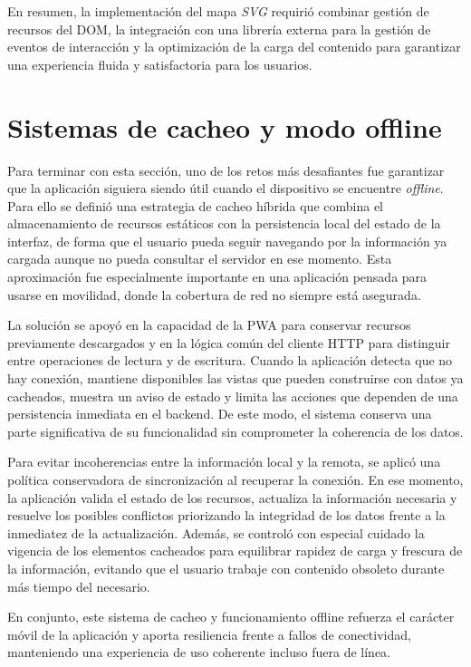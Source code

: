 En resumen, la implementación del mapa \textit{SVG} requirió combinar gestión de recursos del DOM, la integración con una librería externa para la gestión de eventos de interacción y la optimización de la carga del contenido para garantizar una experiencia fluida y satisfactoria para los usuarios.


\section{Sistemas de cacheo y modo offline}

Para terminar con esta sección, uno de los retos más desafiantes fue garantizar que la aplicación siguiera siendo útil cuando el dispositivo se encuentre \textit{offline}. Para ello se definió una estrategia de cacheo híbrida que combina el almacenamiento de recursos estáticos con la persistencia local del estado de la interfaz, de forma que el usuario pueda seguir navegando por la información ya cargada aunque no pueda consultar el servidor en ese momento. Esta aproximación fue especialmente importante en una aplicación pensada para usarse en movilidad, donde la cobertura de red no siempre está asegurada.

La solución se apoyó en la capacidad de la PWA para conservar recursos previamente descargados y en la lógica común del cliente HTTP para distinguir entre operaciones de lectura y de escritura. Cuando la aplicación detecta que no hay conexión, mantiene disponibles las vistas que pueden construirse con datos ya cacheados, muestra un aviso de estado y limita las acciones que dependen de una persistencia inmediata en el backend. De este modo, el sistema conserva una parte significativa de su funcionalidad sin comprometer la coherencia de los datos.

Para evitar incoherencias entre la información local y la remota, se aplicó una política conservadora de sincronización al recuperar la conexión. En ese momento, la aplicación valida el estado de los recursos, actualiza la información necesaria y resuelve los posibles conflictos priorizando la integridad de los datos frente a la inmediatez de la actualización. Además, se controló con especial cuidado la vigencia de los elementos cacheados para equilibrar rapidez de carga y frescura de la información, evitando que el usuario trabaje con contenido obsoleto durante más tiempo del necesario.

En conjunto, este sistema de cacheo y funcionamiento offline refuerza el carácter móvil de la aplicación y aporta resiliencia frente a fallos de conectividad, manteniendo una experiencia de uso coherente incluso fuera de línea.
